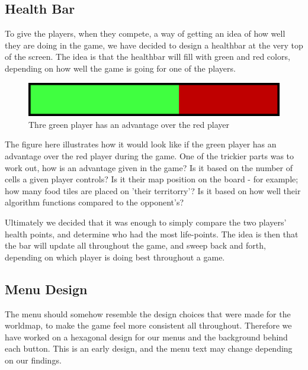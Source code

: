\subsection{Health Bar}

To give the players, when they compete, a way of getting an idea of how well they are doing in the game, we have decided to design a healthbar at the 
very top of the screen. The idea is that the healthbar will fill with green and red colors, depending on how well the game is going for one of the 
players.

\begin{figure}[h]
	\centering
		\includegraphics{img/healthbar_example.png}
	\caption{Thre green player has an advantage over the red player}
	\label{fig:healthbar}
\end{figure}

The figure here illustrates how it would look like if the green player has an advantage over the red player during the game. One of the trickier parts 
was to work out, how is an advantage given in the game? Is it based on the number of cells a given player controls? Is it their map position on the 
board - for example; how many food tiles are placed on 'their territorry'? Is it based on how well their algorithm functions compared to the 
opponent's? 


Ultimately we decided that it was enough to simply compare the two players' health points, and determine who had the most life-points. The idea is then 
that the bar will update all throughout the game, and sweep back and forth, depending on which player is doing best throughout a game.

\subsection{Menu Design}

The menu should somehow resemble the design choices that were made for the worldmap, to make the game feel more consistent all throughout. Therefore we 
have worked on a hexagonal design for our menus and the background behind each button. This is an early design, and the menu text may change depending 
on our findings.

